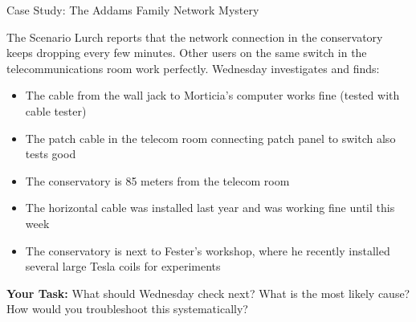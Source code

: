 \documentclass[aspectratio=169]{beamer}
\begin{document}
\begin{frame}{Case Study: The Addams Family Network Mystery}
    \begin{block}{The Scenario}
        Lurch reports that the network connection in the conservatory keeps dropping every few minutes. Other users on the same switch in the telecommunications room work perfectly. Wednesday investigates and finds:
        
        \vspace{0.3cm}
        \begin{itemize}
            \item The cable from the wall jack to Morticia's computer works fine (tested with cable tester)
            \item The patch cable in the telecom room connecting patch panel to switch also tests good
            \item The conservatory is 85 meters from the telecom room
            \item The horizontal cable was installed last year and was working fine until this week
            \item The conservatory is next to Fester's workshop, where he recently installed several large Tesla coils for experiments
        \end{itemize}
    \end{block}
    
    \vspace{0.3cm}
    \textbf{Your Task:} What should Wednesday check next? What is the most likely cause? How would you troubleshoot this systematically?
\end{frame}
\end{document}
